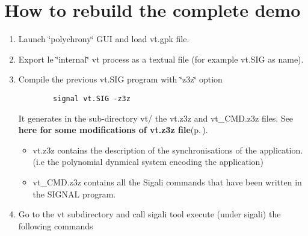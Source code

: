 \section{How to rebuild the complete demo}\label{index_sectB}
\begin{enumerate}
\item Launch \char`\"{}polychrony\char`\"{} GUI and load vt.gpk file.\item Export le \char`\"{}internal\char`\"{} vt process as a textual file (for example vt.SIG as name).\item Compile the previous vt.SIG program with \char`\"{}z3z\char`\"{} option \par
 

\footnotesize\begin{verbatim}		 signal vt.SIG -z3z
                \end{verbatim}
\normalsize
 It generates in the sub-directory vt/ the vt.z3z and vt\_\-CMD.z3z files. See {\bf here for some modifications of vt.z3z file}{\rm (p.\,\pageref{note})}.\begin{itemize}
\item vt.z3z contains the description of the synchronisations of the application. (i.e the polynomial dynmical system encoding the application)\item vt\_\-CMD.z3z contains all the Sigali commands that have been written in the SIGNAL program.\end{itemize}
\item Go to the vt subdirectory and call sigali tool execute (under sigali) the following commands 


\end{enumerate}
